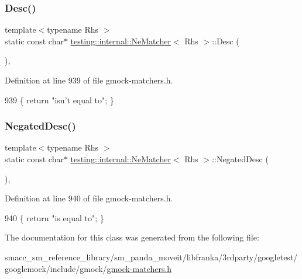 \subsubsection{\texorpdfstring{Desc()}{Desc()}}
{\footnotesize\ttfamily template$<$typename Rhs $>$ \\
static const char$\ast$ \hyperlink{classtesting_1_1internal_1_1NeMatcher}{testing\+::internal\+::\+Ne\+Matcher}$<$ Rhs $>$\+::Desc (\begin{DoxyParamCaption}{ }\end{DoxyParamCaption})\hspace{0.3cm}{\ttfamily [inline]}, {\ttfamily [static]}}



Definition at line 939 of file gmock-\/matchers.\+h.


\begin{DoxyCode}
939 \{ \textcolor{keywordflow}{return} \textcolor{stringliteral}{"isn't equal to"}; \}
\end{DoxyCode}
\mbox{\label{classtesting_1_1internal_1_1NeMatcher_a9ea152391b69d422ba2a88c3d2d2dae5}} 
\subsubsection{\texorpdfstring{Negated\+Desc()}{NegatedDesc()}}
{\footnotesize\ttfamily template$<$typename Rhs $>$ \\
static const char$\ast$ \hyperlink{classtesting_1_1internal_1_1NeMatcher}{testing\+::internal\+::\+Ne\+Matcher}$<$ Rhs $>$\+::Negated\+Desc (\begin{DoxyParamCaption}{ }\end{DoxyParamCaption})\hspace{0.3cm}{\ttfamily [inline]}, {\ttfamily [static]}}



Definition at line 940 of file gmock-\/matchers.\+h.


\begin{DoxyCode}
940 \{ \textcolor{keywordflow}{return} \textcolor{stringliteral}{"is equal to"}; \}
\end{DoxyCode}


The documentation for this class was generated from the following file\+:\begin{DoxyCompactItemize}
\item 
smacc\+\_\+sm\+\_\+reference\+\_\+library/sm\+\_\+panda\+\_\+moveit/libfranka/3rdparty/googletest/googlemock/include/gmock/\hyperlink{gmock-matchers_8h}{gmock-\/matchers.\+h}\end{DoxyCompactItemize}
